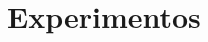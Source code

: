 \documentclass[a0,portrait]{lab-poster}
\begin{document}
\begin{multicols}{2}
\begin{itemize}
\end{itemize}
\section*{\huge Experimentos}



\vspace{-10mm}
\large
\color{NavyBlue}
\color{Black}
\raggedright



\end{multicols}

\end{document}
